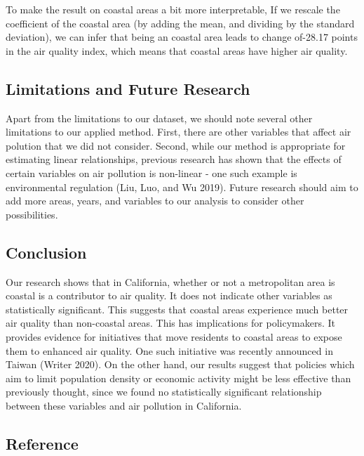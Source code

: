 \documentclass[
]{article}
\begin{document}
To make the result on coastal areas a bit more interpretable, If we
rescale the coefficient of the coastal area (by adding the mean, and
dividing by the standard deviation), we can infer that being an coastal
area leads to change of-28.17 points in the air quality index, which
means that coastal areas have higher air quality.

\hypertarget{limitations-and-future-research}{%
\subsection{Limitations and Future
Research}\label{limitations-and-future-research}}

Apart from the limitations to our dataset, we should note several other
limitations to our applied method. First, there are other variables that
affect air polution that we did not consider. Second, while our method
is appropriate for estimating linear relationships, previous research
has shown that the effects of certain variables on air pollution is
non-linear - one such example is environmental regulation (Liu, Luo, and
Wu 2019). Future research should aim to add more areas, years, and
variables to our analysis to consider other possibilities.

\hypertarget{conclusion}{%
\subsection{Conclusion}\label{conclusion}}

Our research shows that in California, whether or not a metropolitan
area is coastal is a contributor to air quality. It does not indicate
other variables as statistically significant. This suggests that coastal
areas experience much better air quality than non-coastal areas. This
has implications for policymakers. It provides evidence for initiatives
that move residents to coastal areas to expose them to enhanced air
quality. One such initiative was recently announced in Taiwan (Writer
2020). On the other hand, our results suggest that policies which aim to
limit population density or economic activity might be less effective
than previously thought, since we found no statistically significant
relationship between these variables and air pollution in California.

\hypertarget{Reference}{%
\subsection{Reference}\label{Reference}}
\end{document}

